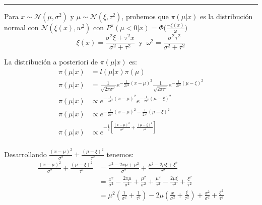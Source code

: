 \documentclass[12pt,]{article}
\begin{document}
\begin{center}\rule{0.5\linewidth}{\linethickness}\end{center}

Para \(x\sim\mathcal{N}(\mu,\sigma^2)\) y
\(\mu\sim\mathcal{N}(\xi,\tau^2)\), probemos que \(\pi(\mu|x)\) es la
distribución normal con \(\mathcal{N}(\xi(x),w^2)\) con
\(P^\pi(\mu<0|x)=\Phi\bigg(\frac{-\xi(x)}{\omega}\bigg)\) \[
\xi(x)=\frac{\sigma^2\xi+\tau^2x}{\sigma^2+\tau^2}\ \text{ y }\ \omega^2=\frac{\sigma^2\tau^2}{\sigma^2+\tau^2}
\]

La distribución a posteriori de \(\pi(\mu|x)\) es: \[
\begin{array}{rl}
\pi(\mu|x) & = l(\mu|x)\pi(\mu)\\
\pi(\mu|x) & = \frac{1}{\sqrt{2\pi\sigma^2}}e^{-\frac{1}{2\sigma^2}(x-\mu)^2}\frac{1}{\sqrt{2\pi\tau^2}}e^{-\frac{1}{2\tau^2}(\mu-\xi)^2}\\
\pi(\mu|x) & \propto e^{-\frac{1}{2\sigma^2}(x-\mu)^2}e^{-\frac{1}{2\tau^2}(\mu-\xi)^2}\\
\pi(\mu|x) & \propto e^{-\frac{1}{2\sigma^2}(x-\mu)^2-\frac{1}{2\tau^2}(\mu-\xi)^2}\\
\pi(\mu|x) & \propto e^{-\frac{1}{2}\left[\frac{(x-\mu)^2}{\sigma^2}+\frac{(\mu-\xi)^2}{\tau^2}\right]}\\
\end{array}
\]

Desarrollando \(\frac{(x-\mu)^2}{\sigma^2}+\frac{(\mu-\xi)^2}{\tau^2}\)
tenemos: \[
\begin{array}{rl}
\frac{(x-\mu)^2}{\sigma^2}+\frac{(\mu-\xi)^2}{\tau^2} & = \frac{x^2-2x\mu+\mu^2}{\sigma^2}+\frac{\mu^2-2\mu\xi+\xi^2}{\tau^2}\\
& = \frac{x^2}{\sigma^2}-\frac{2x\mu}{\sigma^2}+\frac{\mu^2}{\sigma^2}+\frac{\mu^2}{\tau^2}-\frac{2\mu\xi}{\tau^2}+\frac{\xi^2}{\tau^2}\\
& = \mu^2\left(\frac{1}{\sigma^2}+\frac{1}{\tau^2}\right) -2\mu\left(\frac{x}{\sigma^2}+\frac{\xi}{\tau^2}\right)+\frac{x^2}{\sigma^2}+\frac{\xi^2}{\tau^2}\\
\end{array}
\]
\end{document}
